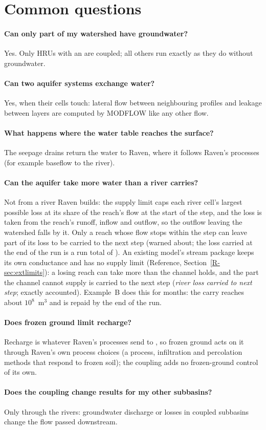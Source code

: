\section{Common questions}
\paragraph{Can only part of my watershed have groundwater?} Yes. Only HRUs with an  are coupled; all
others run exactly as they do without groundwater.
\paragraph{Can two aquifer systems exchange water?} Yes, when their cells touch: lateral flow between neighbouring profiles
and leakage between layers are computed by MODFLOW like any other flow.
\paragraph{What happens where the water table reaches the surface?} The seepage drains return the water to Raven, where it
follows Raven's processes (for example baseflow to the river).
\paragraph{Can the aquifer take more water than a river carries?} Not from a river Raven builds: the supply limit caps
each river cell's largest possible loss at its share of the reach's flow at the start of the step, and the loss is taken
from the reach's runoff, inflow and outflow, so the outflow leaving the watershed falls by it. Only a reach whose flow stops
within the step can leave part of its loss to be carried to the next step (warned about; the loss carried at the end of
the run is a run total of ). An existing model's stream package keeps its own conductance and has
no supply limit (Reference, Section~\ref{R-sec:extlimits}): a losing reach can take more than the channel holds, and the
part the channel cannot supply is carried to the next step (\emph{river loss carried to next step}; exactly accounted).
Example~B does this for months: the carry reaches about $10^{8}$~m$^3$ and is repaid by the end of the run.
\paragraph{Does frozen ground limit recharge?} Recharge is whatever Raven's processes send to , so frozen
ground acts on it through Raven's own process choices (a  process, infiltration and percolation methods
that respond to frozen soil); the coupling adds no frozen-ground control of its own.
\paragraph{Does the coupling change results for my other subbasins?} Only through the rivers: groundwater discharge or
losses in coupled subbasins change the flow passed downstream.
